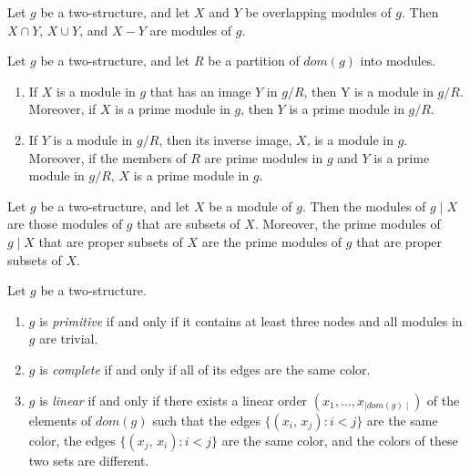 \begin{mytheo}
    \label{thm:2-1}
    Let $g$ be a two-structure, and let $X$ and $Y$ be overlapping modules of $g$.
    Then $X \cap Y$, $X \cup Y$, and $X - Y$ are modules of $g$.
\end{mytheo}

\begin{mytheo}
    \label{thm:2-2}
    Let $g$ be a two-structure, and let $R$ be a partition of $dom(g)$ into modules.
    \begin{enumerate}
        \item If $X$ is a module in $g$ that has an image $Y$ in $g / R$, then Y is a module in $g / R$.
        Moreover, if $X$ is a prime module in $g$, then $Y$ is a prime module in $g / R$.
        \item If $Y$ is a module in $g / R$, then its inverse image, $X$, is a module in $g$.
        Moreover, if the members of $R$ are prime modules in $g$ and $Y$ is a prime module in $g / R$, $X$ is a prime module in $g$.
    \end{enumerate}
\end{mytheo}

\begin{mylem}
    \label{lem:2-3}
    Let $g$ be a two-structure, and let $X$ be a module of $g$.
    Then the modules of $g \mid X$ are those modules of $g$ that are subsets of $X$.
    Moreover, the prime modules of $g \mid X$ that are proper subsets of $X$ are the prime modules of $g$ that are proper subsets of $X$.
\end{mylem}


\begin{mydef}
    \label{def:2-4}
    Let $g$ be a two-structure.
    \begin{enumerate}
        \item $g$ is \textit{primitive} if and only if it contains at least three nodes and all modules in $g$ are trivial.
        \item $g$ is \textit{complete} if and only if all of its edges are the same color.
        \item $g$ is \textit{linear} if and only if there exists a linear order $(x_1, \dots, x_{\mid dom(g) \mid})$ of the elements of $dom(g)$ such that the edges $\{(x_i,\, x_j): i < j\}$ are the same color, the edges $\{(x_j,\, x_i): i < j\}$ are the same color, and the colors of these two sets are different.
    \end{enumerate}
\end{mydef}

